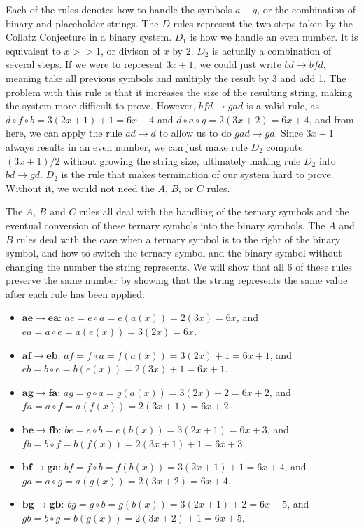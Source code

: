 \documentclass[12pt]{article}
\theoremstyle{definition}
\begin{document}
Each of the rules denotes how to handle the symbols $a-g$, or the combination of binary and placeholder strings. The $D$ rules represent the two steps taken by the Collatz Conjecture in a binary system. $D_1$ is how we handle an even number. It is equivalent to $x >> 1$, or divison of $x$ by 2. $D_2$ is actually a combination of several steps. If we were to represent $3x+1$, we could just write $bd \rightarrow bfd$, meaning take all previous symbols and multiply the result by 3 and add 1. The problem with this rule is that it increases the size of the resulting string, making the system more difficult to prove. However, $bfd \rightarrow gad$ is a valid rule,  as $d \circ f \circ b = 3(2x+1)+1 = 6x+4$ and $d \circ a \circ g = 2(3x+2) = 6x+4$, and from here, we can apply the rule $ad \rightarrow d$ to allow us to do $gad \rightarrow gd$. Since $3x+1$ always results in an even number, we can just make rule $D_2$ compute $(3x+1)/2$ without growing the string size, ultimately making rule $D_2$ into $bd \rightarrow gd$. $D_2$ is the rule that makes termination of our system hard to prove. Without it, we would not need the $A$, $B$, or $C$ rules.\par
The $A$, $B$ and $C$ rules all deal with the handling of the ternary symbols and the eventual conversion of these ternary symbols into the binary symbols. The $A$ and $B$ rules deal with the case when a ternary symbol is to the right of the binary symbol, and how to switch the ternary symbol and the binary symbol without changing the number the string represents. We will show that all 6 of these rules preserve the same number by showing that the string represents the same value after each rule has been applied:
\begin{itemize}
    \item $\boldsymbol{ae \rightarrow ea}$: $ae = e \circ a = e(a(x)) = 2(3x) = 6x$, and $ea = a
    \circ e = a(e(x)) = 3(2x) = 6x$.
    \item $\boldsymbol{af \rightarrow eb}$: $af = f \circ a = f(a(x)) = 3(2x)+1 = 6x+1$, and $eb =
    b \circ e = b(e(x)) = 2(3x)+1 = 6x+1$.
    \item $\boldsymbol{ag \rightarrow fa}$: $ag = g \circ a = g(a(x)) = 3(2x)+2 = 6x+2$, and $fa = a \circ f = a(f(x)) = 2(3x+1) = 6x+2$.
    \item $\boldsymbol{be \rightarrow fb}$: $be = e \circ b = e(b(x)) = 3(2x+1) = 6x+3$, and $fb = b \circ f = b(f(x)) = 2(3x+1)+1 = 6x+3$.
    \item $\boldsymbol{bf \rightarrow ga}$: $bf = f \circ b = f(b(x)) = 3(2x+1)+1 = 6x+4$, and $ga =  a \circ g = a(g(x)) = 2(3x+2) = 6x+4$.
    \item $\boldsymbol{bg \rightarrow gb}$: $bg = g \circ b = g(b(x)) = 3(2x+1)+2 = 6x+5$, and $gb = b \circ g = b(g(x)) = 2(3x+2)+1 = 6x+5$.
\end{itemize}
\end{document}
